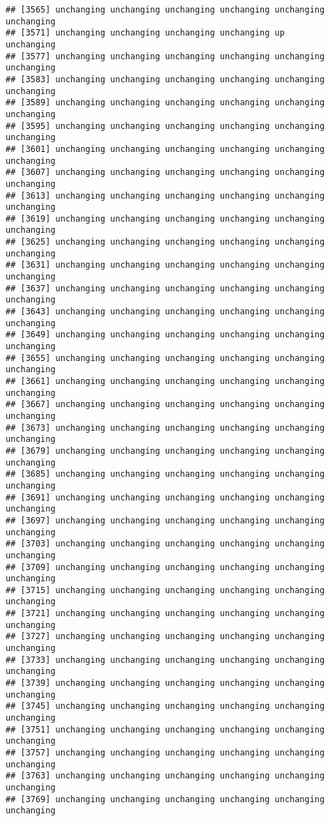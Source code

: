 \documentclass[]{article}
\begin{document}
\begin{verbatim}
## [3565] unchanging unchanging unchanging unchanging unchanging unchanging
## [3571] unchanging unchanging unchanging unchanging up         unchanging
## [3577] unchanging unchanging unchanging unchanging unchanging unchanging
## [3583] unchanging unchanging unchanging unchanging unchanging unchanging
## [3589] unchanging unchanging unchanging unchanging unchanging unchanging
## [3595] unchanging unchanging unchanging unchanging unchanging unchanging
## [3601] unchanging unchanging unchanging unchanging unchanging unchanging
## [3607] unchanging unchanging unchanging unchanging unchanging unchanging
## [3613] unchanging unchanging unchanging unchanging unchanging unchanging
## [3619] unchanging unchanging unchanging unchanging unchanging unchanging
## [3625] unchanging unchanging unchanging unchanging unchanging unchanging
## [3631] unchanging unchanging unchanging unchanging unchanging unchanging
## [3637] unchanging unchanging unchanging unchanging unchanging unchanging
## [3643] unchanging unchanging unchanging unchanging unchanging unchanging
## [3649] unchanging unchanging unchanging unchanging unchanging unchanging
## [3655] unchanging unchanging unchanging unchanging unchanging unchanging
## [3661] unchanging unchanging unchanging unchanging unchanging unchanging
## [3667] unchanging unchanging unchanging unchanging unchanging unchanging
## [3673] unchanging unchanging unchanging unchanging unchanging unchanging
## [3679] unchanging unchanging unchanging unchanging unchanging unchanging
## [3685] unchanging unchanging unchanging unchanging unchanging unchanging
## [3691] unchanging unchanging unchanging unchanging unchanging unchanging
## [3697] unchanging unchanging unchanging unchanging unchanging unchanging
## [3703] unchanging unchanging unchanging unchanging unchanging unchanging
## [3709] unchanging unchanging unchanging unchanging unchanging unchanging
## [3715] unchanging unchanging unchanging unchanging unchanging unchanging
## [3721] unchanging unchanging unchanging unchanging unchanging unchanging
## [3727] unchanging unchanging unchanging unchanging unchanging unchanging
## [3733] unchanging unchanging unchanging unchanging unchanging unchanging
## [3739] unchanging unchanging unchanging unchanging unchanging unchanging
## [3745] unchanging unchanging unchanging unchanging unchanging unchanging
## [3751] unchanging unchanging unchanging unchanging unchanging unchanging
## [3757] unchanging unchanging unchanging unchanging unchanging unchanging
## [3763] unchanging unchanging unchanging unchanging unchanging unchanging
## [3769] unchanging unchanging unchanging unchanging unchanging unchanging

\end{verbatim}
\end{document}
